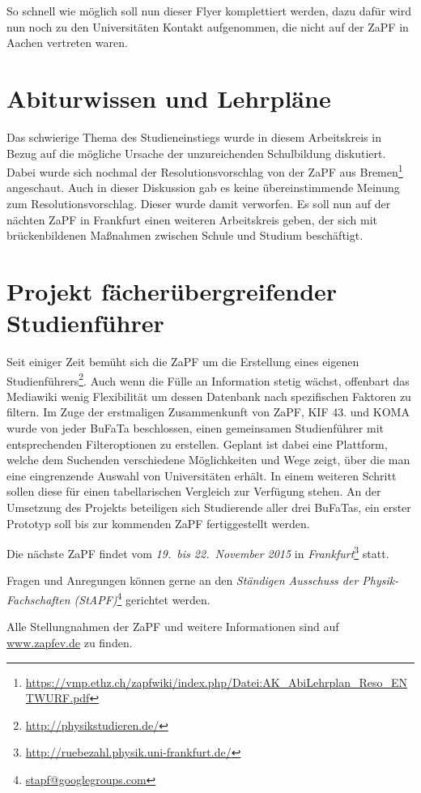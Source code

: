 \documentclass{scrartcl}
\begin{document}
So schnell wie möglich soll nun dieser Flyer komplettiert werden, dazu dafür
wird nun noch zu den Universitäten Kontakt aufgenommen, die nicht auf der
ZaPF in Aachen vertreten waren.

\section*{Abiturwissen und Lehrpläne}

Das schwierige Thema des Studieneinstiegs wurde in diesem Arbeitskreis in Bezug
auf die mögliche Ursache der unzureichenden Schulbildung diskutiert.  Dabei
wurde sich nochmal der Resolutionsvorschlag von der ZaPF aus Bremen\footnote{\href{https://vmp.ethz.ch/zapfwiki/index.php/Datei:AK_AbiLehrplan_Reso_ENTWURF.pdf}{\url{https://vmp.ethz.ch/zapfwiki/index.php/Datei:AK_AbiLehrplan_Reso_ENTWURF.pdf}}}
angeschaut. Auch in dieser Diskussion gab es keine übereinstimmende Meinung zum
Resolutionsvorschlag. Dieser wurde damit verworfen.  Es soll nun auf der
nächten ZaPF in Frankfurt einen weiteren Arbeitskreis geben, der sich mit
brückenbildenen Maßnahmen zwischen Schule und Studium beschäftigt.


\section*{Projekt fächerübergreifender Studienführer }

Seit einiger Zeit bemüht sich die ZaPF um die Erstellung eines eigenen
Studienführers\footnote{\href{http://physikstudieren.de/}{\url{http://physikstudieren.de/}}}.
Auch wenn die Fülle an Information stetig wächst, offenbart das Mediawiki wenig
Flexibilität um dessen Datenbank nach spezifischen Faktoren zu filtern.  Im
Zuge der erstmaligen Zusammenkunft von ZaPF, KIF 43. und KOMA wurde von jeder
BuFaTa beschlossen, einen gemeinsamen Studienführer mit entsprechenden
Filteroptionen zu erstellen. Geplant ist dabei eine Plattform, welche dem
Suchenden verschiedene Möglichkeiten und Wege zeigt, über die man eine
eingrenzende Auswahl von Universitäten erhält. In einem weiteren Schritt sollen
diese für einen tabellarischen Vergleich zur Verfügung stehen.  An der
Umsetzung des Projekts beteiligen sich Studierende aller drei BuFaTas, ein
erster Prototyp soll bis zur kommenden ZaPF fertiggestellt werden.


\vspace{0.5cm}
Die nächste ZaPF findet vom \emph{19.\ bis 22.\ November 2015} in \emph{Frankfurt}\footnote{\href{http://ruebezahl.physik.uni-frankfurt.de/}{\url{http://ruebezahl.physik.uni-frankfurt.de/}}} statt.

Fragen und Anregungen können gerne an den \emph{Ständigen Ausschuss der Physik-Fachschaften (StAPF)}\footnote{\href{mailto:stapf@googlegroups.com}{\url{stapf@googlegroups.com}}} gerichtet werden.

Alle Stellungnahmen der ZaPF und weitere Informationen sind auf \href{http://www.zapfev.de}{\url{www.zapfev.de}} zu finden.
\end{document}
